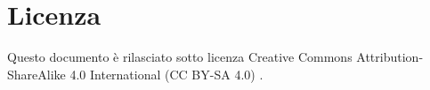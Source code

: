 \documentclass[../../docenti.tex]{subfiles}
\begin{document}
\section{Licenza}
Questo documento è rilasciato sotto licenza Creative Commons Attribution-ShareAlike 4.0 International (CC BY-SA 4.0) \cite{CreativeCommons4.0}.
\end{document}

